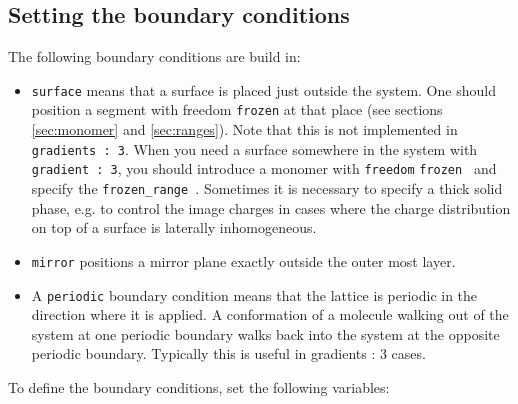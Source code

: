 \documentclass{article}
\begin{document}
\subsection{Setting the boundary conditions} 

The following boundary conditions are build in:

\begin{itemize}

\item {\tt surface} means that a surface is placed just outside the system. One should position a segment with freedom {\tt frozen} at that place (see sections \ref{sec:monomer} and \ref{sec:ranges}). Note that this is not implemented in {\tt gradients : 3}. When you need a surface somewhere in the system with {\tt gradient : 3}, you should introduce a monomer with {\tt freedom} {\tt frozen } and specify the  {\tt frozen\_range }. Sometimes it is necessary to specify a thick solid phase, e.g. to control the image charges in cases where the charge distribution on top of a surface is laterally inhomogeneous.

\item {\tt mirror} positions a mirror plane exactly outside the outer most layer. 

\item A {\tt periodic} boundary condition means that the lattice is periodic in the direction where it is applied.  A conformation of a molecule walking out of the system at one periodic boundary walks back into the system at the opposite periodic boundary. Typically this is useful in gradients : 3 cases. 

\end{itemize}
To define the boundary conditions, set the following variables:
\end{document}
